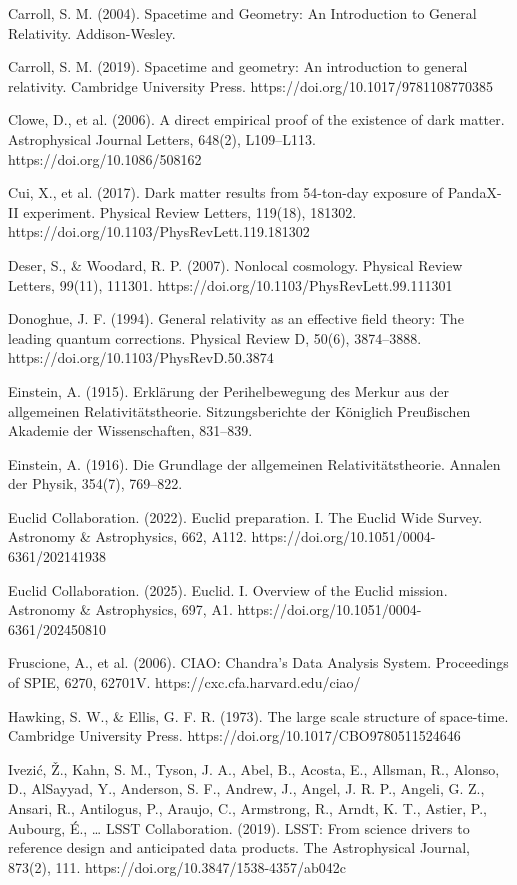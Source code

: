 \documentclass[11pt]{article}
\begin{document}
Carroll, S. M. (2004). Spacetime and Geometry: An Introduction to General Relativity. Addison-Wesley.

Carroll, S. M. (2019). Spacetime and geometry: An introduction to general relativity. Cambridge University Press. https://doi.org/10.1017/9781108770385

Clowe, D., et al. (2006). A direct empirical proof of the existence of dark matter. Astrophysical Journal Letters, 648(2), L109--L113. https://doi.org/10.1086/508162

Cui, X., et al. (2017). Dark matter results from 54-ton-day exposure of PandaX-II experiment. Physical Review Letters, 119(18), 181302. https://doi.org/10.1103/PhysRevLett.119.181302

Deser, S., \& Woodard, R. P. (2007). Nonlocal cosmology. Physical Review Letters, 99(11), 111301. https://doi.org/10.1103/PhysRevLett.99.111301

Donoghue, J. F. (1994). General relativity as an effective field theory: The leading quantum corrections. Physical Review D, 50(6), 3874--3888. https://doi.org/10.1103/PhysRevD.50.3874

Einstein, A. (1915). Erklärung der Perihelbewegung des Merkur aus der allgemeinen Relativitätstheorie. Sitzungsberichte der Königlich Preußischen Akademie der Wissenschaften, 831--839.

Einstein, A. (1916). Die Grundlage der allgemeinen Relativitätstheorie. Annalen der Physik, 354(7), 769--822.

Euclid Collaboration. (2022). Euclid preparation. I. The Euclid Wide Survey. Astronomy \& Astrophysics, 662, A112. https://doi.org/10.1051/0004-6361/202141938

Euclid Collaboration. (2025). Euclid. I. Overview of the Euclid mission. Astronomy \& Astrophysics, 697, A1. https://doi.org/10.1051/0004-6361/202450810

Fruscione, A., et al. (2006). CIAO: Chandra's Data Analysis System. Proceedings of SPIE, 6270, 62701V. https://cxc.cfa.harvard.edu/ciao/

Hawking, S. W., \& Ellis, G. F. R. (1973). The large scale structure of space-time. Cambridge University Press. https://doi.org/10.1017/CBO9780511524646

Ivezić, Ž., Kahn, S. M., Tyson, J. A., Abel, B., Acosta, E., Allsman, R., Alonso, D., AlSayyad, Y., Anderson, S. F., Andrew, J., Angel, J. R. P., Angeli, G. Z., Ansari, R., Antilogus, P., Araujo, C., Armstrong, R., Arndt, K. T., Astier, P., Aubourg, É., \ldots{} LSST Collaboration. (2019). LSST: From science drivers to reference design and anticipated data products. The Astrophysical Journal, 873(2), 111. https://doi.org/10.3847/1538-4357/ab042c
\end{document}

